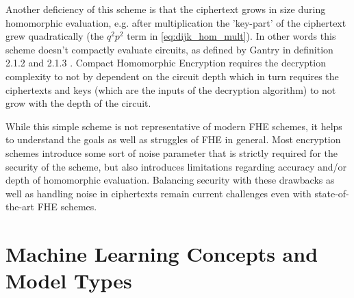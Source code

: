 Another deficiency of this scheme is that the ciphertext grows in size during homomorphic evaluation, e.g. after multiplication the 'key-part' of the ciphertext grew quadratically (the $q^2 p^2$ term in \ref{eq:dijk_hom_mult}). In other words this scheme doesn't compactly evaluate circuits, as defined by Gantry in definition 2.1.2 and 2.1.3 \cite{gentry_fully_2009}. Compact Homomorphic Encryption requires the decryption complexity to not by dependent on the circuit depth which in turn requires the ciphertexts and keys (which are the inputs of the decryption algorithm) to not grow with the depth of the circuit.

While this simple scheme is not representative of modern FHE schemes, it helps to understand the goals as well as struggles of FHE in general. Most encryption schemes introduce some sort of noise parameter that is strictly required for the security of the scheme, but also introduces limitations regarding accuracy and/or depth of homomorphic evaluation. Balancing security with these drawbacks as well as handling noise in ciphertexts remain current challenges even with state-of-the-art FHE schemes.

\section{Machine Learning Concepts and Model Types}
